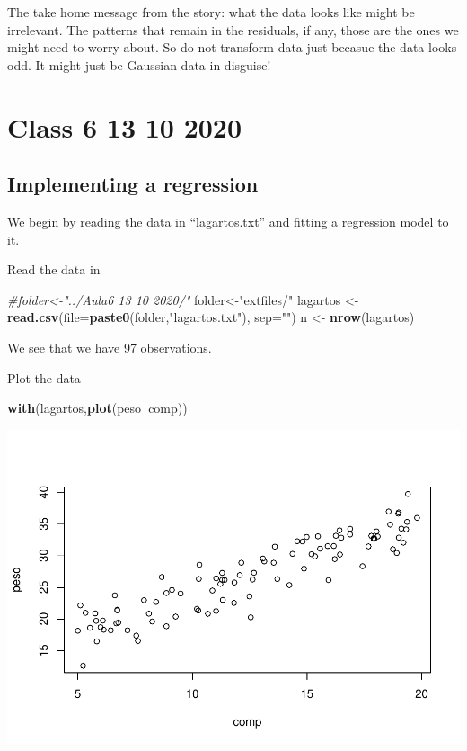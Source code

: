 \documentclass[
]{book}
\newenvironment{Shaded}{\begin{snugshade}}{\end{snugshade}}
\newcommand{\CommentTok}[1]{\textcolor[rgb]{0.56,0.35,0.01}{\textit{#1}}}
\newcommand{\DataTypeTok}[1]{\textcolor[rgb]{0.13,0.29,0.53}{#1}}
\newcommand{\KeywordTok}[1]{\textcolor[rgb]{0.13,0.29,0.53}{\textbf{#1}}}
\newcommand{\NormalTok}[1]{#1}
\newcommand{\OperatorTok}[1]{\textcolor[rgb]{0.81,0.36,0.00}{\textbf{#1}}}
\newcommand{\StringTok}[1]{\textcolor[rgb]{0.31,0.60,0.02}{#1}}
\begin{document}
The take home message from the story: what the data looks like might be irrelevant. The patterns that remain in the residuals, if any, those are the ones we might need to worry about. So do not transform data just becasue the data looks odd. It might just be Gaussian data in disguise!

\hypertarget{aula6}{%
\chapter{Class 6 13 10 2020}\label{aula6}}

\hypertarget{implementing-a-regression}{%
\section{Implementing a regression}\label{implementing-a-regression}}

We begin by reading the data in ``lagartos.txt'' and fitting a regression model to it.

Read the data in

\begin{Shaded}
\begin{Highlighting}[]
\CommentTok{#folder<-"../Aula6 13 10 2020/"}
\NormalTok{folder<-}\StringTok{"extfiles/"}
\NormalTok{lagartos <-}\StringTok{ }\KeywordTok{read.csv}\NormalTok{(}\DataTypeTok{file=}\KeywordTok{paste0}\NormalTok{(folder,}\StringTok{"lagartos.txt"}\NormalTok{), }\DataTypeTok{sep=}\StringTok{""}\NormalTok{)}
\NormalTok{n <-}\StringTok{ }\KeywordTok{nrow}\NormalTok{(lagartos)}
\end{Highlighting}
\end{Shaded}

We see that we have 97 observations.

Plot the data

\begin{Shaded}
\begin{Highlighting}[]
\KeywordTok{with}\NormalTok{(lagartos,}\KeywordTok{plot}\NormalTok{(peso}\OperatorTok{~}\NormalTok{comp))}
\end{Highlighting}
\end{Shaded}

\includegraphics{ECOMODbook_files/figure-latex/a6.2-1.pdf}
\end{document}
